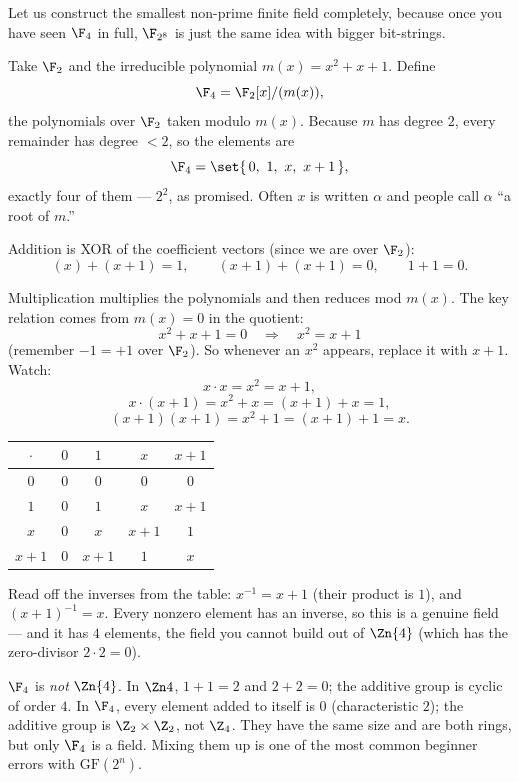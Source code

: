 Let us construct the smallest non-prime finite field completely, because
once you have seen $\F_4$ in full, $\F_{2^8}$ is just the same idea with
bigger bit-strings.

Take $\F_2$ and the irreducible polynomial $m(x) = x^2 + x + 1$. Define
\[
\F_4 = \F_2[x] / (m(x)),
\]
the polynomials over $\F_2$ taken modulo $m(x)$. Because $m$ has degree $2$,
every remainder has degree $< 2$, so the elements are
\[
\F_4 = \set{\, 0,\ 1,\ x,\ x+1 \,},
\]
exactly four of them --- $2^2$, as promised. Often $x$ is written $\alpha$
and people call $\alpha$ ``a root of $m$.''

Addition is XOR of the coefficient vectors (since we are over $\F_2$):
\[
(x) + (x+1) = 1, \qquad (x+1)+(x+1) = 0, \qquad 1 + 1 = 0.
\]

Multiplication multiplies the polynomials and then reduces mod $m(x)$. The
key relation comes from $m(x)=0$ in the quotient:
\[
x^2 + x + 1 = 0 \quad\Longrightarrow\quad x^2 = x + 1
\]
(remember $-1 = +1$ over $\F_2$). So whenever an $x^2$ appears, replace it
with $x+1$. Watch:
\[
x \cdot x = x^2 = x + 1,
\]
\[
x \cdot (x+1) = x^2 + x = (x+1) + x = 1,
\]
\[
(x+1)(x+1) = x^2 + 1 = (x+1) + 1 = x.
\]

\begin{center}
\begin{tabular}{c|cccc}
$\cdot$ & $0$ & $1$ & $x$ & $x{+}1$ \\
\hline
$0$     & $0$ & $0$   & $0$   & $0$ \\
$1$     & $0$ & $1$   & $x$   & $x{+}1$ \\
$x$     & $0$ & $x$   & $x{+}1$ & $1$ \\
$x{+}1$ & $0$ & $x{+}1$ & $1$ & $x$ \\
\end{tabular}
\end{center}

Read off the inverses from the table: $x^{-1} = x+1$ (their product is $1$),
and $(x+1)^{-1} = x$. Every nonzero element has an inverse, so this is a
genuine field --- and it has $4$ elements, the field you cannot build out of
$\Zn{4}$ (which has the zero-divisor $2\cdot 2 = 0$).

\begin{trapbox}
$\F_4$ is \emph{not} $\Zn{4}$. In $\Zn 4$, $1+1 = 2$ and $2+2 = 0$; the
additive group is cyclic of order $4$. In $\F_4$, every element added to
itself is $0$ (characteristic $2$); the additive group is $\Z_2 \times
\Z_2$, not $\Z_4$. They have the same size and are both rings, but only
$\F_4$ is a field. Mixing them up is one of the most common beginner errors
with $\mathrm{GF}(2^n)$.
\end{trapbox}

